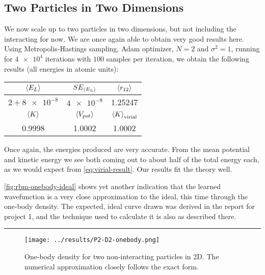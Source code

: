 \documentclass[a4paper, 11pt]{article}
\begin{document}
\clearpage
\begin{multicols}{2}

    \subsection{Two Particles in Two Dimensions} 

    We now scale up to two particles in two dimensions, but not including the
    interacting for now. We are once again able to obtain very good results
    here. Using Metropolis-Hastings sampling, Adam optimizer, $N=2$ and
    $\sigma^2=1$, running for $\num{4e4}$ iterations with $100$ samples per
    iteration, we obtain the following results (all energies in atomic units):
    \begin{center}
    \begin{tabular}{|c|c|c|}\hline
        $\expval{E_L}$ & $SE_{\expval{E_L}}$ & $\expval{r_{12}}$ \\\hline
        $2+\num{8e-8}$ & $\num{4e-8}$ & 1.25247 \\\hline
        $\expval{K}$ & $\expval{V_{pot}}$ & $\expval{K}_\text{virial}$\\\hline
        0.9998 & 1.0002 & 1.0002 \\\hline
    \end{tabular}
    \end{center}
    Once again, the energies produced are very accurate. From the mean potential
    and kinetic energy we see both coming out to about half of the total energy
    each, as we would expect from \autoref{eq:virial-result}. Our results fit the theory well. 

    \autoref{fig:rbm-onebody-ideal} shows yet another indication that the
    learned wavefunction is a very close approximation to the ideal, this time
    through the one-body density. The expected, ideal curve drawn was derived in
    the report for project 1, and the technique used to calculate it is also as
    described there.

\end{multicols}
\hrule
\begin{figure}[ht]
    \centering
    \texttt{[image: ../results/P2-D2-onebody.png]}
    \caption{One-body density for two non-interacting particles in 2D. The
    numerical approximation closely follows the exact form.}
    \label{fig:rbm-onebody-ideal}
\end{figure}
\end{document}

